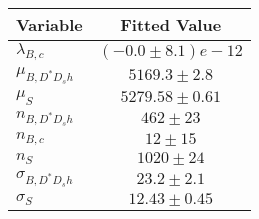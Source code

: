 \begin{tabular}[t]{lc}
\hline
Variable &Fitted Value\\
\hline\hline
$\lambda_{B,c}$&$(-0.0\pm8.1)e-12$\\
\hline
$\mu_{B, D^* D_s h}$&$5169.3\pm2.8$\\
\hline
$\mu_S$&$5279.58\pm0.61$\\
\hline
$n_{B, D^* D_s h}$&$462\pm23$\\
\hline
$n_{B,c}$&$12\pm15$\\
\hline
$n_S$&$1020\pm24$\\
\hline
$\sigma_{B, D^* D_s h}$&$23.2\pm2.1$\\
\hline
$\sigma_S$&$12.43\pm0.45$\\
\hline
\end{tabular}